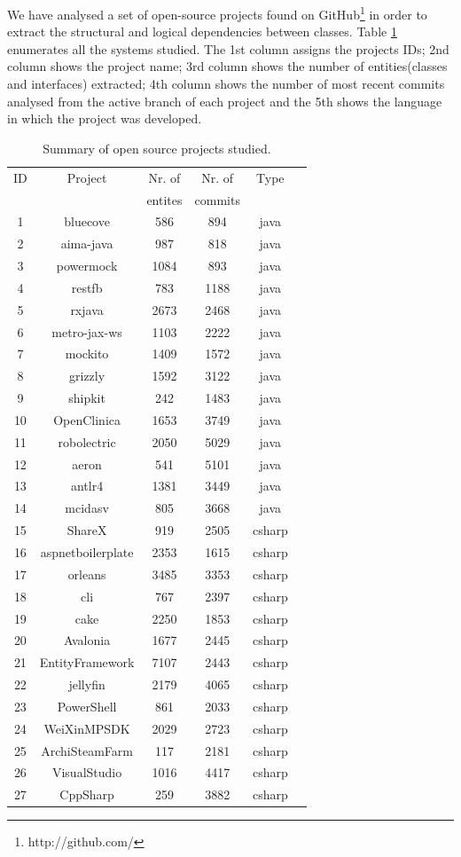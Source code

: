 \documentclass[a4paper,twoside]{article}
\begin{document}
We have analysed a set of open-source projects found on GitHub\footnote{http://github.com/} \cite{Kalliamvakou2016} in order to extract the structural and logical dependencies between classes. Table \ref{table:1} enumerates all the systems studied. The 1st column assigns the projects IDs; 2nd column shows the project name; 3rd column shows the number of entities(classes and interfaces) extracted; 4th column shows the number of most recent commits analysed from the active branch of each project and the 5th shows the language in which the project was developed.
\begin{table}[!h]
\caption{Summary of open source projects studied.}
\label{table:1}
\centering
\begin{tabular}{|c|c|c|c|c|c|}
\hline
   ID  & Project    & Nr. of & Nr. of& Type\\
     &     & entites & commits & \\
\hline
1	&	bluecove	&	586	&	894	&	java	\\
2	&	aima-java	&	987	&	818	&	java	\\
3	&	powermock	&	1084	&	893	&	java	\\
4	&	restfb	&	783	&	1188	&	java	\\
5	&	rxjava	&	2673	&	2468	&	java	\\
6	&	metro-jax-ws	&	1103	&	2222	&	java	\\
7	&	mockito	&	1409	&	1572	&	java	\\
8	&	grizzly	&	1592	&	3122	&	java	\\
9	&	shipkit	&	242	&	1483	&	java	\\
10	&	OpenClinica	&	1653	&	3749	&	java	\\
11	&	robolectric	&	2050	&	5029	&	java	\\
12	&	aeron	&	541	&	5101	&	java	\\
13	&	antlr4	&	1381	&	3449	&	java	\\
14	&	mcidasv	&	805	&	3668	&	java	\\
15	&	ShareX	&	919	&	2505	&	csharp	\\
16	&	aspnetboilerplate	&	2353	&	1615	&	csharp	\\
17	&	orleans	&	3485	&	3353	&	csharp	\\
18	&	cli	&	767	&	2397	&	csharp	\\
19	&	cake	&	2250	&	1853	&	csharp	\\
20	&	Avalonia	&	1677	&	2445	&	csharp	\\
21	&	EntityFramework	&	7107	&	2443	&	csharp	\\
22	&	jellyfin	&	2179	&	4065	&	csharp	\\
23	&	PowerShell	&	861	&	2033	&	csharp	\\
24	&	WeiXinMPSDK	&	2029	&	2723	&	csharp	\\
25	&	ArchiSteamFarm	&	117	&	2181	&	csharp	\\
26	&	VisualStudio	&	1016	&	4417	&	csharp	\\
27	&	CppSharp	&	259	&	3882	&	csharp	\\
\hline
\end{tabular}
\end{table}
\end{document}
